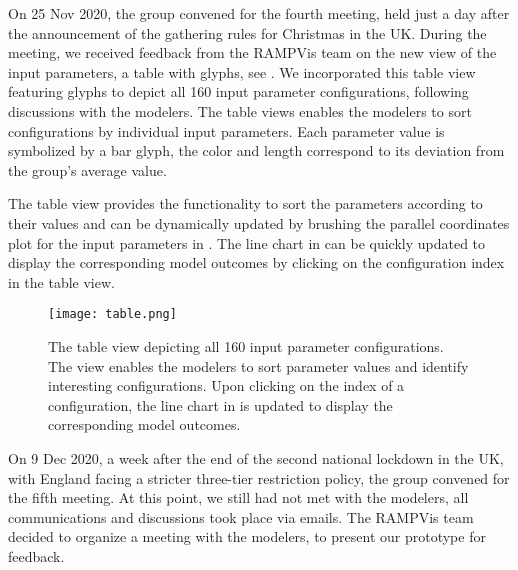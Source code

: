 
On 25 Nov 2020, the group convened for the fourth meeting, held just a day after the announcement of the gathering rules for Christmas in the UK.
During the meeting, we received feedback from the RAMPVis team on the new view of the input parameters, a table with glyphs, see . We incorporated this table view featuring glyphs to depict all 160 input parameter configurations, following discussions with the modelers.
The table views enables the modelers to sort configurations by individual input parameters. Each parameter value is symbolized by a bar glyph, the color and length correspond to its deviation from the group's average value.

The table view provides the functionality to sort the parameters according to their values and can be dynamically updated by brushing the parallel coordinates plot for the input parameters in . The line chart in  can be quickly updated to display the corresponding model outcomes by clicking on the configuration index in the table view.

\begin{figure}[tb!]
    \centering
    \texttt{[image: table.png]}
    \caption{The table view depicting all 160 input parameter configurations.
    The view enables the modelers to sort parameter values and identify interesting configurations.
    Upon clicking on the index of a configuration, the line chart in  is updated to display the corresponding model outcomes.
    }
    \label{fig:table-view}

\end{figure}


On 9 Dec 2020, a week after the end of the second national lockdown in the UK, with England facing a stricter three-tier restriction policy, the group convened for the fifth meeting.
At this point, we still had not met with the modelers, all communications and discussions took place via emails.
The RAMPVis team decided to organize a meeting with the modelers, to present our prototype for feedback.


